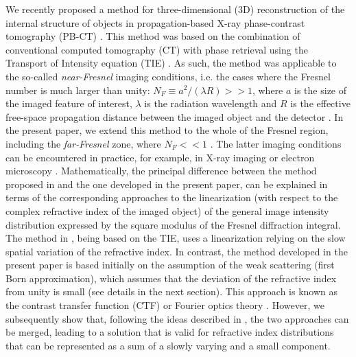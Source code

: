\documentclass[twocolumn, switch]{article} %
\begin{document}
We recently proposed a method for three-dimensional (3D) reconstruction of the internal structure of objects in propagation-based X-ray phase-contrast tomography (PB-CT) \cite{Thompson2019FastTomography}. This method was based on the combination of conventional computed tomography (CT) with phase retrieval using the Transport of Intensity equation (TIE) \cite{Teague1983DeterministicSolution}. As such, the method was applicable to the so-called \textit{near-Fresnel} imaging conditions, i.e. the cases where the Fresnel number is much larger than unity: ${N_F} \equiv {a^2}/(\lambda R) >> 1$, where $a$ is the size of the imaged feature of interest, $\lambda$ is the radiation wavelength and $R$ is the effective free-space propagation distance between the imaged object and the detector \cite{Gureyev2004LinearRegion}. In the present paper, we extend this method to the whole of the Fresnel region, including the \textit{far-Fresnel} zone, where ${N_F} <  < 1$ . The latter imaging conditions can be encountered in practice, for example, in X-ray imaging \cite{Mayo2003X-rayMicrotomography} or electron microscopy \cite{Cowley1995DiffractionPhysics}. Mathematically, the principal difference between the method proposed in \cite{Thompson2019FastTomography} and the one developed in the present paper, can be explained in terms of the corresponding approaches to the linearization (with respect to the complex refractive index of the imaged object) of the general image intensity distribution expressed by the square modulus of the Fresnel diffraction integral. The method in \cite{Thompson2019FastTomography}, being based on the TIE, uses a linearization relying on the slow spatial variation of the refractive index. In contrast, the method developed in the present paper is based initially on the assumption of the weak scattering (first Born approximation), which assumes that the deviation of the refractive index from unity is small (see details in the next section). This approach is known as the contrast transfer function (CTF) or Fourier optics theory \cite{Cowley1995DiffractionPhysics, Pogany1997ContrastSource}. However, we subsequently show that, following the ideas described in \cite{Wu2003AImaging., Gureyev2004LinearRegion, Guigay2007MixedRegion., Nesterets2016PartiallyApproximation, Gureyev2017LinearConditions}, the two approaches can be merged, leading to a solution that is valid for refractive index distributions that can be represented as a sum of a slowly varying and a small component.
\end{document}
